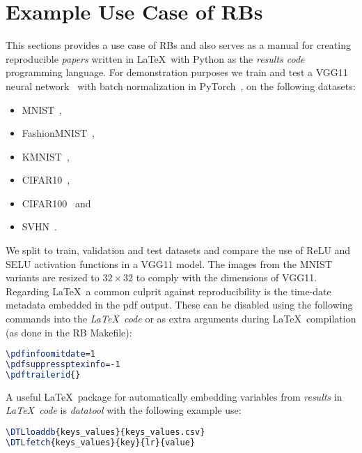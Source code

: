 \documentclass[journal]{IEEEtran}
\begin{document}
\section{Example Use Case of RBs}
This sections provides a use case of RBs and also serves as a manual for creating reproducible \textit{papers} written in \LaTeX\ with Python as the \textit{results code} programming language.
For demonstration purposes we train and test a VGG11 neural network~\cite{simonyan2014very} with batch normalization in PyTorch~\cite{paszke2019pytorch}, on the following datasets:
\begin{itemize}
	\item MNIST~\cite{lecun2010mnist},
	\item FashionMNIST~\cite{xiao2017fashion},
	\item KMNIST~\cite{clanuwat2018deep},
	\item CIFAR10~\cite{krizhevsky2009learning},
	\item CIFAR100~\cite{krizhevsky2009learning} and
	\item SVHN~\cite{netzer2011reading}.
\end{itemize}

We split to train, validation and test datasets and compare the use of ReLU and SELU activation functions in a VGG11 model.
The images from the MNIST variants are resized to $32\times 32$ to comply with the dimensions of VGG11.
Regarding \LaTeX\ a common culprit against reproducibility is the time-date metadata embedded in the pdf output.
These can be disabled using the following commands into the \textit{\LaTeX\ code} or as extra arguments during \LaTeX\ compilation (as done in the RB Makefile):
\begin{lstlisting}[language=TeX, style=lststyle, caption={\LaTeX\ pdf reproducibility commands.}, captionpos=b]
\pdfinfoomitdate=1
\pdfsuppressptexinfo=-1
\pdftrailerid{}
\end{lstlisting}

A useful \LaTeX\ package for automatically embedding variables from \textit{results} in \textit{\LaTeX\ code} is \textit{datatool} with the following example use:
\begin{lstlisting}[language=TeX, style=lststyle, caption={\LaTeX\ datatool example of loading a file that contains pairs of keys and values (keys\_values.csv) generated by a \textit{results code} and getting the value of a key named lr.}, captionpos=b]
\DTLloaddb{keys_values}{keys_values.csv}
\DTLfetch{keys_values}{key}{lr}{value}
\end{lstlisting}
\end{document}
